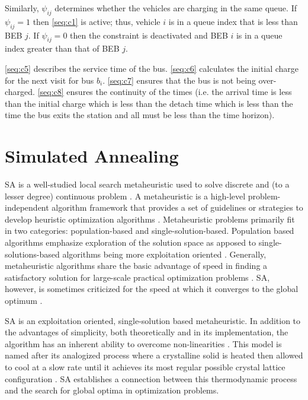 \documentclass[11pt,a4paper,final]{article}
\begin{document}
Similarly, \(\psi_{ij}\) determines whether the vehicles are charging in the same queue. If \(\psi_{ij} = 1\) then \eqref{seq:c1}
is active; thus, vehicle \(i\) is in a queue index that is less than BEB \(j\). If \(\psi_{ij} = 0\) then the constraint is
deactivated and BEB \(i\) is in a queue index greater than that of BEB \(j\).

 \ref{seq:c5} describes the service time of the bus. \ref{seq:c6} calculates the initial charge for the next visit for
bus \(b_i\). \ref{seq:c7} ensures that the bus is not being over-charged. \ref{seq:c8} ensures the continuity of the times
(i.e. the arrival time is less than the initial charge which is less than the detach time which is less than the time
the bus exits the station and all must be less than the time horizon).
\section{Simulated Annealing}
\label{sec:simulated-annealing}
SA is a well-studied local search metaheuristic used to solve discrete and (to a lesser degree) continuous problem
\cite{gendreau-2018-handb-metah,press-1992-numer-recip}. A metaheuristic is a high-level problem-independent algorithm
framework that provides a set of guidelines or strategies to develop heuristic optimization algorithms
\cite{radosavljevic-2018-metah-optim}. Metaheuristic problems primarily fit in two categories: population-based and
single-solution-based. Population based algorithms emphasize exploration of the solution space as apposed to
single-solutions-based algorithms being more exploitation oriented \cite{radosavljevic-2018-metah-optim}. Generally,
metaheuristic algorithms share the basic advantage of speed in finding a satisfactory solution for large-scale practical
optimization problems \cite{radosavljevic-2018-metah-optim}. SA, however, is sometimes criticized for the speed at
which it converges to the global optimum \cite{gendreau-2018-handb-metah,henderson-1989-theor-pract}.

SA is an exploitation oriented, single-solution based metaheuristic. In addition to the advantages of simplicity, both
theoretically and in its implementation, the algorithm has an inherent ability to overcome non-linearities
\cite{gendreau-2018-handb-metah,radosavljevic-2018-metah-optim}. This model is named after its analogized process
where a crystalline solid is heated then allowed to cool at a slow rate until it achieves its most regular possible
crystal lattice configuration \cite{henderson-1989-theor-pract,press-1992-numer-recip}. SA establishes a connection
between this thermodynamic process and the search for global optima in optimization problems.
\end{document}
